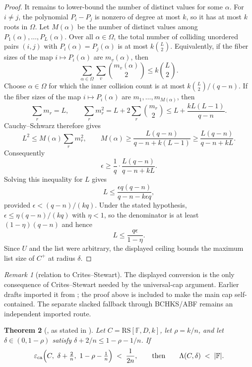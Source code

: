 \documentclass[11pt]{article}
\newtheorem{theorem}{Theorem}[section]
\theoremstyle{definition}
\theoremstyle{remark}
\newtheorem{remark}[theorem]{Remark}
\newcommand{\F}{\mathbb{F}}
\newcommand{\RS}{\mathrm{RS}}
\newcommand{\eca}{\varepsilon_{\mathrm{ca}}}
\newcommand{\Lst}{\Lambda}
\begin{document}
\begin{proof}
It remains to lower-bound the number of distinct values for some
$\alpha$.  For $i\ne j$, the polynomial $P_i-P_j$ is nonzero of degree
at most $k$, so it has at most $k$ roots in $\Omega$.  Let $M(\alpha)$
be the number of distinct values among $P_1(\alpha),\ldots,P_L(\alpha)$.
Over all $\alpha\in\Omega$, the total number of colliding unordered pairs
$(i,j)$ with $P_i(\alpha)=P_j(\alpha)$ is at most $k\binom L2$.
Equivalently, if the fiber sizes of the map $i\mapsto P_i(\alpha)$ are
$m_v(\alpha)$, then
\[
        \sum_{\alpha\in\Omega}\sum_v \binom{m_v(\alpha)}2
        \le k\binom L2 .
\]
Choose $\alpha\in\Omega$ for which the inner collision count is at most
$k\binom L2/(q-n)$.  If the fiber sizes of the map $i\mapsto P_i(\alpha)$ are
$m_1,\ldots,m_{M(\alpha)}$, then
\[
        \sum_r m_r=L,
        \qquad
        \sum_r m_r^2=L+2\sum_r\binom{m_r}{2}
        \le L+\frac{kL(L-1)}{q-n}.
\]
Cauchy--Schwarz therefore gives
\[
        L^2\le M(\alpha)\sum_r m_r^2,
        \qquad
        M(\alpha)\ge
        \frac{L(q-n)}{q-n+k(L-1)}
        \ge
        \frac{L(q-n)}{q-n+kL} .
\]
Consequently
\[
        \epsilon
        \ge
        \frac1q\cdot \frac{L(q-n)}{q-n+kL}.
\]
Solving this inequality for $L$ gives
\[
        L
        \le
        \frac{\epsilon q(q-n)}{q-n-k\epsilon q},
\]
provided $\epsilon<(q-n)/(kq)$.  Under the stated hypothesis,
$\epsilon\le\eta(q-n)/(kq)$ with $\eta<1$, so the denominator is at
least $(1-\eta)(q-n)$ and hence
\[
        L\le \frac{q\epsilon}{1-\eta}.
\]
Since $U$ and the list were arbitrary, the displayed ceiling bounds the
maximum list size of $C^+$ at radius $\delta$.
\end{proof}

\begin{remark}[relation to Crites--Stewart]
The displayed conversion is the only consequence of Crites--Stewart
needed by the universal-cap argument.  Earlier drafts imported it from
\cite[Thm.~2]{CS25}; the proof above is included to make the main cap
self-contained.  The separate slacked fallback through BCHKS/ABF remains
an independent imported route.
\end{remark}

\begin{theorem}[{\cite[Thm.~1.9]{BCHKS25}}, as stated in {\cite[Thm.~5.2]{ABF26}}]\label{thm:B}
Let $C=\RS[\F,D,k]$, let $\rho=k/n$, and let $\delta\in(0,1-\rho)$ satisfy $\delta+2/n\le 1-\rho-1/n$. If
\[
\eca\Bigl(C,\ \delta+\tfrac2n,\ 1-\rho-\tfrac1n\Bigr)\;<\;\frac1{2n},
\qquad\text{then}\qquad
\Lst(C,\delta)\;<\;|\F| .
\]
\end{theorem}
\end{document}
